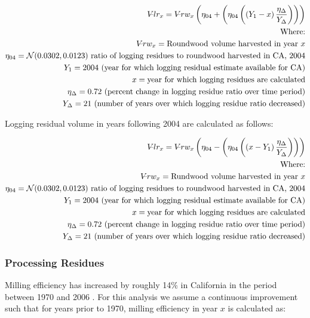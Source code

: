 \documentclass[a4paper]{article}
\begin{document}
\begin{align*}
V\llap{--}lr_{x} = V\llap{--}rw_{x}\left(\eta_{04}+ \left(\eta_{04}\left(\left(Y_1-x\right)\frac{\eta_\Delta}{Y_\Delta}\right)\right)\right)\\
\text{Where:}\\
V\llap{--}rw_{x} = \text{Roundwood volume harvested in year }x\\
\eta_{04} = \mathcal{N}(0.0302,0.0123) \text{ ratio of logging residues to roundwood harvested in CA, 2004}\\
Y_1 = 2004 \text{ (year for which logging residual estimate available for CA)} \\
x = \text{year for which logging residues are calculated}\\
\eta_\Delta = 0.72 \text{ (percent change in logging residue ratio over time period)}\\
Y_\Delta = 21\text{ (number of years over which logging residue ratio decreased)}
\end{align*}

Logging residual volume in years following 2004 are calculated as follows:

\begin{align*}
V\llap{--}lr_{x} = V\llap{--}rw_{x}\left(\eta_{04}- \left(\eta_{04}\left(\left(x-Y_1\right)\frac{\eta_\Delta}{Y_\Delta}\right)\right)\right)\\
\text{Where:}\\
V\llap{--}rw_{x} = \text{Rundwood volume harvested in year }x\\
\eta_{04} = \mathcal{N}(0.0302,0.0123) \text{ ratio of logging residues to roundwood harvested in CA, 2004}\\
Y_1 = 2004 \text{ (year for which logging residual estimate available for CA)} \\
x = \text{year for which logging residues are calculated}\\
\eta_\Delta = 0.72 \text{ (percent change in logging residue ratio over time period)}\\
Y_\Delta = 21\text{ (number of years over which logging residue ratio decreased)}
\end{align*}

\subsubsection{Processing Residues}
\label{sec:orgheadline9}
Milling efficiency has increased by roughly 14\% in California in the period between 1970 and 2006 \citet{Keegan2010}. For this analysis we assume a continuous improvement such that for years prior to 1970, milling efficiency in year \(x\) is calculated as:
\end{document}
